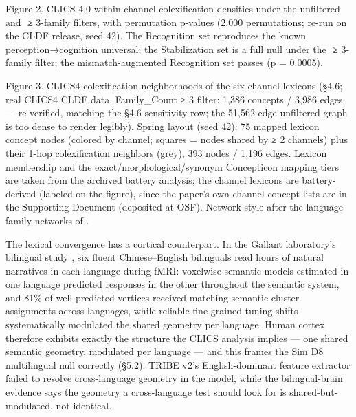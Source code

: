 \documentclass[
]{article}
\begin{document}
Figure 2. CLICS 4.0 within-channel colexification densities under the
unfiltered and { ≥ 3}-family filters, with permutation {p}-values
(2{,}000 permutations; re-run on the CLDF release, seed 42). The
Recognition set reproduces the known perception{→}cognition universal;
the Stabilization set is a full null under the { ≥ 3}-family filter; the
mismatch-augmented Recognition set passes ({p = 0.0005}).

Figure 3. CLICS4 colexification neighborhoods of the six channel
lexicons (§4.6; real CLICS4 CLDF data, Family\_Count {≥} 3 filter:
1{,}386 concepts / 3{,}986 edges --- re-verified, matching the §4.6
sensitivity row; the 51{,}562-edge unfiltered graph is too dense to
render legibly). Spring layout (seed 42): 75 mapped lexicon concept
nodes (colored by channel; squares = nodes shared by {≥} 2 channels)
plus their 1-hop colexification neighbors (grey), 393 nodes / 1{,}196
edges. Lexicon membership and the exact/morphological/synonym
Concepticon mapping tiers are taken from the archived battery analysis;
the channel lexicons are battery-derived (labeled on the figure), since
the paper's own channel-concept lists are in the Supporting Document
(deposited at OSF). Network style after the language-family networks of
{}.

The lexical convergence has a cortical counterpart. In the Gallant
laboratory's bilingual study , six fluent Chinese--English bilinguals
read hours of natural narratives in each language during fMRI: voxelwise
semantic models estimated in one language predicted responses in the
other throughout the semantic system, and 81\% of well-predicted
vertices received matching semantic-cluster assignments across
languages, while reliable fine-grained tuning shifts systematically
modulated the shared geometry per language. Human cortex therefore
exhibits exactly the structure the CLICS analysis implies --- one shared
semantic geometry, modulated per language --- and this frames the Sim D8
multilingual null correctly (§5.2): TRIBE v2's English-dominant feature
extractor failed to resolve cross-language geometry in the model, while
the bilingual-brain evidence says the geometry a cross-language test
should look for is shared-but-modulated, not identical.
\end{document}
